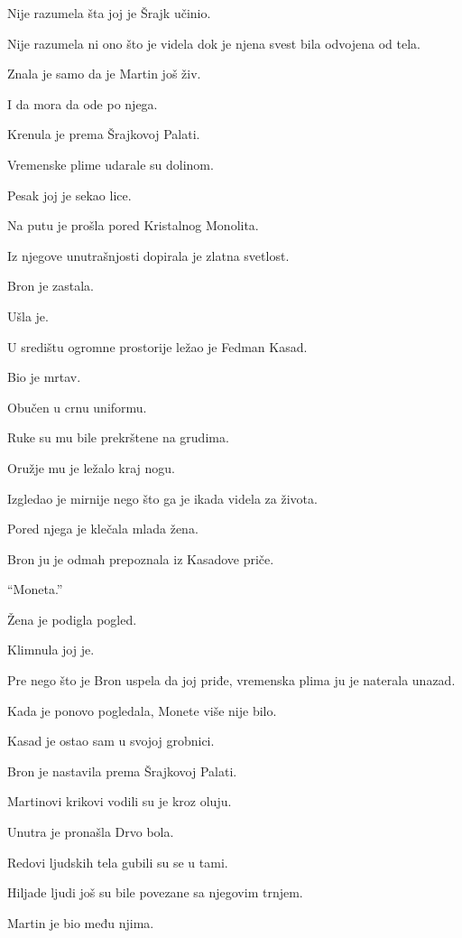Nije razumela šta joj je Šrajk učinio.

Nije razumela ni ono što je videla dok je njena svest bila odvojena od tela.

Znala je samo da je Martin još živ.

I da mora da ode po njega.

\bigskip

Krenula je prema Šrajkovoj Palati.

Vremenske plime udarale su dolinom.

Pesak joj je sekao lice.

Na putu je prošla pored Kristalnog Monolita.

Iz njegove unutrašnjosti dopirala je zlatna svetlost.

Bron je zastala.

Ušla je.

\bigskip

U središtu ogromne prostorije ležao je Fedman Kasad.

Bio je mrtav.

Obučen u crnu uniformu.

Ruke su mu bile prekrštene na grudima.

Oružje mu je ležalo kraj nogu.

Izgledao je mirnije nego što ga je ikada videla za života.

Pored njega je klečala mlada žena.

Bron ju je odmah prepoznala iz Kasadove priče.

``Moneta.''

Žena je podigla pogled.

Klimnula joj je.

Pre nego što je Bron uspela da joj priđe, vremenska plima ju je naterala unazad.

Kada je ponovo pogledala, Monete više nije bilo.

Kasad je ostao sam u svojoj grobnici.

\bigskip

Bron je nastavila prema Šrajkovoj Palati.

Martinovi krikovi vodili su je kroz oluju.

\bigskip

Unutra je pronašla Drvo bola.

Redovi ljudskih tela gubili su se u tami.

Hiljade ljudi još su bile povezane sa njegovim trnjem.

Martin je bio među njima.

